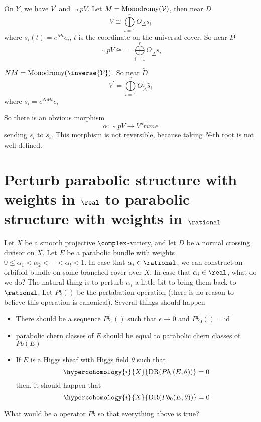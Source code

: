 \documentclass{article}
\begin{document}
On $Y$, we have $V^\prime$ and $\pullback{p}V$. Let $M = \text{Monodromy}(\mathcal{V})$, then near $D$
\[
    V \cong \bigoplus\limits_{i=1}^{r} O_{\Delta}s_i
\]
where $s_i(t) = e^{Mt}e_i$, $t$ is the coordinate on the universal cover. So near $\tilde{D}$
\[
    \pullback{p}V \cong = \bigoplus\limits_{i=1}^{r} O_{\tilde{\Delta}}s_i
\]

$NM = \text{Monodromy}(\inverse{\V})$. So near $\tilde{D}$
\[
    V^\prime = \bigoplus\limits_{i=1}^{r} O_{\tilde{\Delta}}\tilde{s_i}
\]
where $\tilde{s_i} = e^{NMt}e_i$

So there is an obvious morphism 
\[
    \alpha : \pullback{p}V \rightarrow V^prime
\]
sending $s_i$ to $\tilde{s_i}$. This morphism is not reversible, because taking $N$-th root is not
well-defined.



 


\section{Perturb parabolic structure with weights in $\real$ to parabolic structure with weights in 
$\rational$}
Let $X$ be a smooth projective $\complex$-variety, and let $D$ be a normal crossing divisor on $X$.
Let $E$ be a parabolic bundle with weights $0 \leq \alpha_1 < \alpha_2 < \cdots < \alpha_l <1$. 
In case that $\alpha_i \in \rational$, we can construct an orbifold bundle on some branched cover over $X$.
In case that $\alpha_i \in \real$, what do we do? The natural thing is to perturb $\alpha_i$ a little bit
to bring them back to $\rational$. Let $Pb()$ be the pertabation operation (there is no reason to believe 
this operation is canonical). Several things should happen\newline
\begin{itemize}
\item There should be a sequence $Pb_{\epsilon}()$ such that $\epsilon \rightarrow 0$ and
    $Pb_0() = \text{id}$
\item parabolic chern classes of $E$ should be equal to parabolic chern classes of $Pb(E)$
\item If $E$ is a Higgs sheaf with Higgs field $\theta$ such that 
    \[
        \hypercohomology{i}{X}{\text{DR}(Pb_{\epsilon}(E, \theta))} = 0
    \]
    then, it should happen that
    \[
        \hypercohomology{i}{X}{\text{DR}(Pb_{0}(E, \theta))} = 0
    \]
\end{itemize}
\begin{question}
What would be a operator $Pb$ so that everything above is true?
\end{question}
\end{document}
